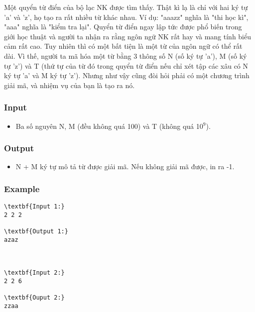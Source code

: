 

Một quyển từ điển của bộ lạc NK được tìm thấy. Thật kì lạ là chỉ với hai ký tự 'a' và 'z', họ tạo ra rất nhiều từ khác nhau. Ví dụ: "aaazz" nghĩa là "thi học kì", "aaa" nghĩa là "kiểm tra lại". Quyển từ điển ngay lập tức được phổ biến trong giới học thuật và người ta nhận ra rằng ngôn ngữ NK rất hay và mang tính biểu cảm rất cao. Tuy nhiên thì có một bất tiện là một từ của ngôn ngữ có thể rất dài. Vì thế, người ta mã hóa một từ bằng 3 thông số N (số ký tự 'a'), M (số ký tự 'z') và T (thứ tự của từ đó trong quyển từ điển nếu chỉ xét tập các xâu có N ký tự 'a' và M ký tự 'z'). Nhưng như vậy cũng đòi hỏi phải có một chương trình giải mã, và nhiệm vụ của bạn là tạo ra nó.

\subsubsection{Input}
\begin{itemize}
	\item Ba số nguyên N, M (đều không quá 100) và T (không quá 10$^9$). 
\end{itemize}

\subsubsection{Output}
\begin{itemize}
	\item N + M ký tự mô tả từ được giải mã. Nếu không giải mã được, in ra -1. 
\end{itemize}

\subsubsection{Example}
\begin{verbatim}
\textbf{Input 1:}
2 2 2

\textbf{Output 1:}
azaz



\textbf{Input 2:}
2 2 6

\textbf{Ouput 2:}
zzaa
\end{verbatim}
